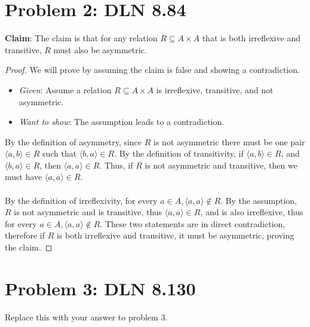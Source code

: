 \documentclass[titlepage]{article}
\begin{document}
\section{Problem 2: DLN 8.84}

\textbf{Claim}: The claim is that for any relation $R \subseteq A \times A$ that is both irreflexive and transitive, $R$ must also be asymmetric. 

\begin{proof}
We will prove by assuming the claim is false and showing a contradiction.

\begin{itemize}
\item \emph{Given}: Assume a relation $R \subseteq A \times A$ is irreflexive, transitive, and not asymmetric.  
\item \emph{Want to show}: The assumption leads to a contradiction.
\end{itemize}
By the definition of asymmetry, since $R$ is not asymmetric there must be one pair $\langle a,b\rangle \in R$ such that $\langle b,a\rangle \in R$. By the definition of transitivity, if $\langle a,b \rangle \in R$, and $\langle b,a\rangle \in R$, then $\langle a,a\rangle \in R$. Thus, if $R$ is not asymmetric and transitive, then we must have $\langle a,a \rangle \in R$.
\\
\\
By the definition of irreflexivity, for every $a \in A, \langle a,a\rangle \notin R$. By the assumption, $R$ is not asymmetric and is transitive, thus $\langle a,a \rangle \in R$, and is also irreflexive, thus for every $a \in A, \langle a,a\rangle \notin R$. These two statements are in direct contradiction, therefore if $R$ is both irreflexive and transitive, it must be asymmetric, proving the claim.


\end{proof}

\section{Problem 3: DLN 8.130}

Replace this with your answer to problem 3.
\end{document}
